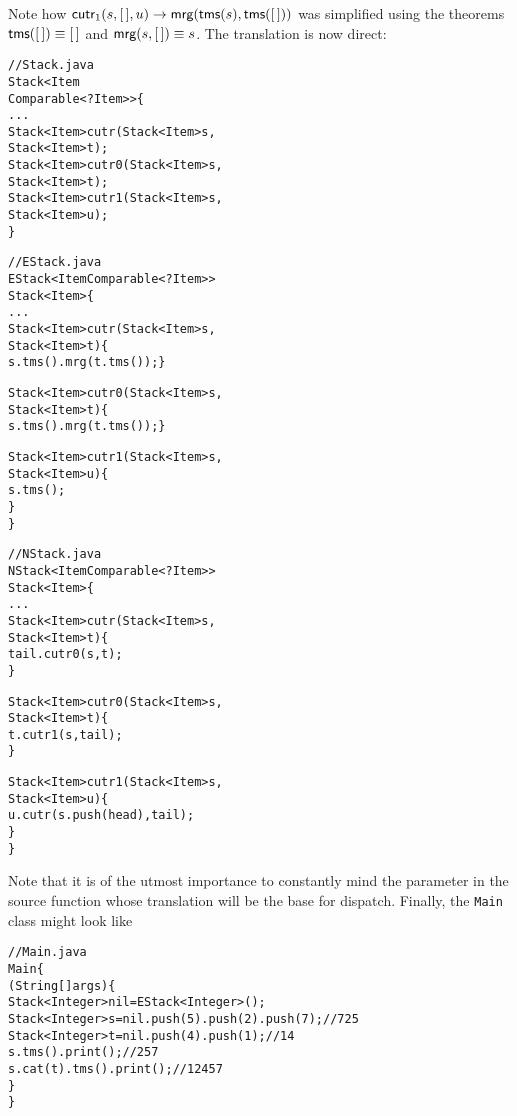 Note how \(\textsf{cutr}_1(s,[\,],u) \rightarrow
\textsf{mrg}(\textsf{tms}(s),\textsf{tms}([\,]))\) was simplified using the
theorems \(\textsf{tms}([\,]) \equiv [\,]\) and \(\textsf{mrg}(s,[\,]) \equiv
s\). The translation is now direct:
\begin{alltt}
// Stack.java
\public \abstractX \class Stack<Item
\hfill\extends Comparable<? \super Item>> \{
  ...
  \public    \abstractX Stack<Item> cutr(\final Stack<Item> s,
                                      \final Stack<Item> t);
  \protectedX \abstractX Stack<Item> cutr0(\final Stack<Item> s,
                                       \final Stack<Item> t);
  \protectedX \abstractX Stack<Item> cutr1(\final Stack<Item> s,
                                       \final Stack<Item> u);
\}

// EStack.java
\public \class EStack<Item \extends Comparable<? \super Item>> 
       \extends Stack<Item> \{
  ...
  \public Stack<Item> cutr(\final Stack<Item> s,
                          \final Stack<Item> t) \{
    \return s.tms().mrg(t.tms()); \}

  \protectedX Stack<Item> cutr0(\final Stack<Item> s,
                              \final Stack<Item> t) \{
    \return s.tms().mrg(t.tms()); \}

  \protectedX Stack<Item> cutr1(\final Stack<Item> s,
                              \final Stack<Item> u) \{
    \return s.tms(); 
  \}
\}

// NStack.java
\public \class NStack<Item \extends Comparable<? \super Item>>
       \extends Stack<Item> \{
  ...
  \public Stack<Item> cutr(\final Stack<Item> s,
                          \final Stack<Item> t) \{
    \return tail.cutr0(s,t);
  \}

  \protectedX Stack<Item> cutr0(\final Stack<Item> s,
                              \final Stack<Item> t) \{
    \return t.cutr1(s,tail);
  \}

  \protectedX Stack<Item> cutr1(\final Stack<Item> s,
                              \final Stack<Item> u) \{
    \return u.cutr(s.push(head),tail);
  \}
\}
\end{alltt}
Note that it is of the utmost importance to constantly mind the
parameter in the source function whose translation will be the base
for dispatch. Finally, the \texttt{Main} class might look like
\begin{alltt}
// Main.java
\public \class Main \{
  \public \static \void \main (String[] args) \{
    Stack<Integer> nil = \new EStack<Integer>();
    Stack<Integer> s = nil.push(5).push(2).push(7);\hfill// 7 2 5
    Stack<Integer> t = nil.push(4).push(1);\hfill// 1 4
    s.tms().print();\hfill// 2 5 7
    s.cat(t).tms().print();\hfill// 1 2 4 5 7
  \}
\}
\end{alltt}
